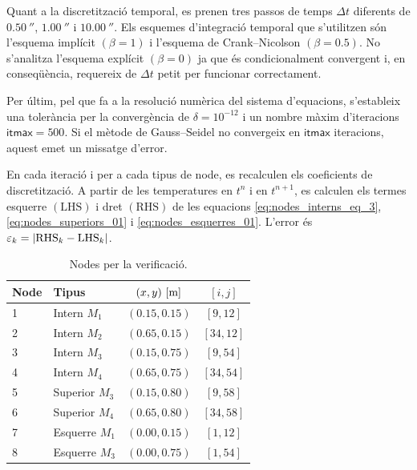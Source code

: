 Quant a la discretització temporal, es prenen tres passos de temps $\Delta t$ diferents de $0.50 \ \second$, $1.00 \ \second$ i $10.00 \ \second$. Els esquemes d'integració temporal que s'utilitzen són l'esquema implícit $\left( \beta = 1 \right)$ i l'esquema de Crank--Nicolson $\left( \beta = 0.5 \right)$. No s'analitza l'esquema explícit $\left( \beta = 0 \right)$ ja que és condicionalment convergent i, en conseqüència, requereix de $\Delta t$ petit per funcionar correctament.

Per últim, pel que fa a la resolució numèrica del sistema d'equacions, s'estableix una tolerància per la convergència de $\delta = 10^{-12}$ i un nombre màxim d'iteracions $\textsf{itmax} = 500$. Si el mètode de Gauss--Seidel no convergeix en $\textsf{itmax}$ iteracions, aquest emet un missatge d'error.

En cada iteració i per a cada tipus de node, es recalculen els coeficients de discretització. A partir de les temperatures en $t^n$ i en $t^{n+1}$, es calculen els termes esquerre $\left( \mathrm{LHS} \right)$ i dret $\left( \mathrm{RHS} \right)$ de les equacions 
\eqref{eq:nodes_interns_eq_3}, \eqref{eq:nodes_superiors_01} i \eqref{eq:nodes_esquerres_01}. L'error és $\varepsilon_k = \abs{\mathrm{RHS}_k - \mathrm{LHS}_k}$.

\begin{table}[ht]
	\centering
	\begin{tabular}{llcc}
		\toprule[0.5mm]
		Node & Tipus & $(x,y) \ [\meter]$ & $[i,j]$ \\
		\midrule[0.25mm]
		1 & Intern $M_1$ 	& $(0.15, 0.15)$ & $[9,12]$ \\
		2 & Intern $M_2$ 	& $(0.65, 0.15)$ & $[34,12]$ \\
		3 & Intern $M_3$ 	& $(0.15, 0.75)$ & $[9,54]$ \\
		4 & Intern $M_4$ 	& $(0.65, 0.75)$ & $[34,54]$ \\
		5 & Superior $M_3$ 	& $(0.15, 0.80)$ & $[9,58]$ \\
		6 & Superior $M_4$ 	& $(0.65, 0.80)$ & $[34,58]$ \\
		7 & Esquerre $M_1$ 	& $(0.00, 0.15)$ & $[1,12]$ \\
		8 & Esquerre $M_3$ 	& $(0.00, 0.75)$ & $[1,54]$ \\
		\bottomrule[0.5mm]
	\end{tabular}
	\caption{Nodes per la verificació.}
	\label{tab:nodes_verificacio}
\end{table}

